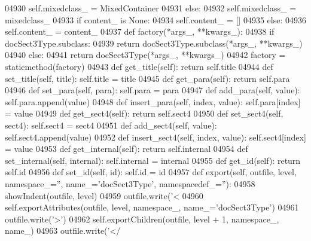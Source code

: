 \begin{DoxyCode}
{{{{{{{{{{{{{{{{{{{{{{{{{{{{{{{{{{{{{{{{{{{{{{{{{{{{{{{{{{{{{{{{{{{{{{{{{{{{{{{{{{{{{{{{{{{{{{{{{{{{{{{{{{{{{{{{{{{{{{{{{{{{{{{{{{{{{{{{{{{{{{{{{{{{{{{{{{{{{{{{{{{{{{{{{{{{{{{{{{{{{{{{{{{{{{{{{{{{{{{{{{{{{{{{{{{{{{{{{{{{{{{{{{{{{{{{{{{{{{{{{{{{{{{{{{{{{{{{{{{{{{{{{{{{{{{{{{{{{{{{{{{{{{{{{{{{{{{{{{{{{{{{{{{{{{{{{{{{{{{{{{{{{{{{04930             self.mixedclass_ = MixedContainer
04931         \textcolor{keywordflow}{else}:
04932             self.mixedclass_ = mixedclass\_
04933         \textcolor{keywordflow}{if} content\_ \textcolor{keywordflow}{is} \textcolor{keywordtype}{None}:
04934             self.content_ = []
04935         \textcolor{keywordflow}{else}:
04936             self.content_ = content\_
04937     \textcolor{keyword}{def }factory(*args\_, **kwargs\_):
04938         \textcolor{keywordflow}{if} docSect3Type.subclass:
04939             \textcolor{keywordflow}{return} docSect3Type.subclass(*args\_, **kwargs\_)
04940         \textcolor{keywordflow}{else}:
04941             \textcolor{keywordflow}{return} docSect3Type(*args\_, **kwargs\_)
04942     factory = staticmethod(factory)
04943     \textcolor{keyword}{def }get_title(self): \textcolor{keywordflow}{return} self.title
04944     \textcolor{keyword}{def }set_title(self, title): self.title = title
04945     \textcolor{keyword}{def }get_para(self): \textcolor{keywordflow}{return} self.para
04946     \textcolor{keyword}{def }set_para(self, para): self.para = para
04947     \textcolor{keyword}{def }add_para(self, value): self.para.append(value)
04948     \textcolor{keyword}{def }insert_para(self, index, value): self.para[index] = value
04949     \textcolor{keyword}{def }get_sect4(self): \textcolor{keywordflow}{return} self.sect4
04950     \textcolor{keyword}{def }set_sect4(self, sect4): self.sect4 = sect4
04951     \textcolor{keyword}{def }add_sect4(self, value): self.sect4.append(value)
04952     \textcolor{keyword}{def }insert_sect4(self, index, value): self.sect4[index] = value
04953     \textcolor{keyword}{def }get_internal(self): \textcolor{keywordflow}{return} self.internal
04954     \textcolor{keyword}{def }set_internal(self, internal): self.internal = internal
04955     \textcolor{keyword}{def }get_id(self): \textcolor{keywordflow}{return} self.id
04956     \textcolor{keyword}{def }set_id(self, id): self.id = id
04957     \textcolor{keyword}{def }export(self, outfile, level, namespace\_='', name\_='docSect3Type', namespacedef\_=''):
04958         showIndent(outfile, level)
04959         outfile.write(\textcolor{stringliteral}{'<%
04960         self.exportAttributes(outfile, level, namespace\_, name\_=\textcolor{stringliteral}{'docSect3Type'})
04961         outfile.write(\textcolor{stringliteral}{'>'})
04962         self.exportChildren(outfile, level + 1, namespace\_, name\_)
04963         outfile.write(\textcolor{stringliteral}{'</%
}}}}}}}}}}}}}}}}}}}}}}}}}}}}}}}}}}}}}}}}}}}}}}}}}}}}}}}}}}}}}}}}}}}}}}}}}}}}}}}}}}}}}}}}}}}}}}}}}}}}}}}}}}}}}}}}}}}}}}}}}}}}}}}}}}}}}}}}}}}}}}}}}}}}}}}}}}}}}}}}}}}}}}}}}}}}}}}}}}}}}}}}}}}}}}}}}}}}}}}}}}}}}}}}}}}}}}}}}}}}}}}}}}}}}}}}}}}}}}}}}}}}}}}}}}}}}}}}}}}}}}}}}}}}}}}}}}}}}}}}}}}}}}}}}}}}}}}}}}}}}}}}}}}}}}}}}}}}}}}}}}}}}}}}}}
\end{DoxyCode}
